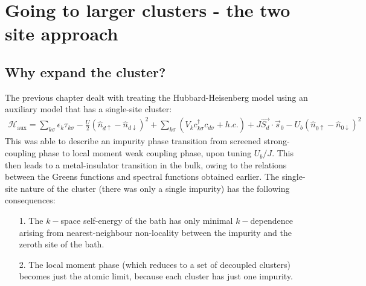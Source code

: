 \documentclass[10pt]{report}
\numberwithin{equation}{section}
\begin{document}
\chapter{Going to larger clusters - the two site approach}

\section{Why expand the cluster?}
The previous chapter dealt with treating the Hubbard-Heisenberg model using an auxiliary model that has a single-site cluster:
\begin{equation}\begin{aligned}
	\mathcal{H}_\text{aux} =  \sum_{k\sigma}\epsilon_k \tau_{k\sigma} - \frac{U}{2}\left( \hat n_{d \uparrow} - \hat n_{d \downarrow} \right) ^2 + \sum_{k\sigma} \left(V_{k} c^\dagger_{k\sigma} c_{d\sigma} + h.c.\right) +J \vec{S_d}\cdot\vec{s}_0 - U_b\left(\hat n_{0 \uparrow} - \hat n_{0 \downarrow}\right)^2
\end{aligned}\end{equation}
This was able to describe an impurity phase transition from screened strong-coupling phase to local moment weak coupling phase, upon tuning \(U_b/J\). This then leads to a metal-insulator transition in the bulk, owing to the relations between the Greens functions and spectral functions obtained earlier. The single-site nature of the cluster (there was only a single impurity) has the following consequences:
\begin{itemize}
	\item [1.] The \(k-\)space self-energy of the bath has only minimal \(k-\)dependence arising from nearest-neighbour non-locality between the impurity and the zeroth site of the bath.
	\item [2.] The local moment phase (which reduces to a set of decoupled clusters) becomes just the atomic limit, because each cluster has just one impurity.
\end{itemize}
\end{document}
